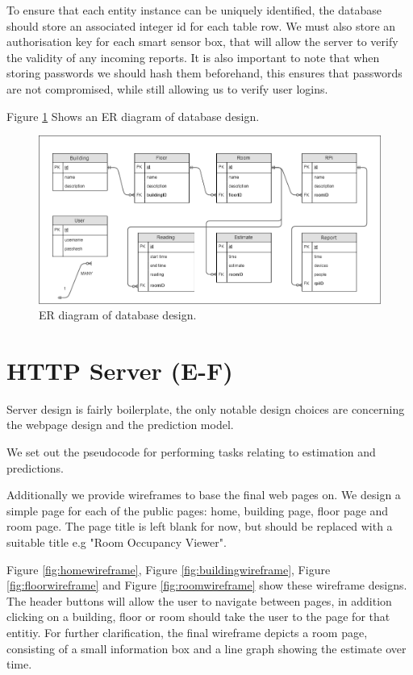 \documentclass{l4proj}
\begin{document}
To ensure that each entity instance can be uniquely identified, the database should store an associated integer id for each table row.
We must also store an authorisation key for each smart sensor box, that will allow the server to verify the validity of any incoming reports.
It is also important to note that when storing passwords we should hash them beforehand, this ensures that passwords are not compromised, while still allowing us to verify user logins.

Figure \ref{fig:ERdiagram} Shows an ER diagram of database design.
\begin{figure}
\centering
\includegraphics[width=\textwidth]{ERdiagram}
\caption{ER diagram of database design.}
\label{fig:ERdiagram}
\end{figure}



\section{HTTP Server (E-F)}

Server design is fairly boilerplate, the only notable design choices are concerning the webpage design and the prediction model.

We set out the pseudocode for performing tasks relating to estimation and predictions.

Additionally we provide wireframes to base the final web pages on. We design a simple page for each of the public pages: home, building page, floor page and room page. The page title is left blank for now, but should be replaced with a suitable title e.g "Room Occupancy Viewer".

Figure \ref{fig:homewireframe}, Figure \ref{fig:buildingwireframe}, Figure \ref{fig:floorwireframe} and Figure \ref{fig:roomwireframe} show these wireframe designs. The header buttons will allow the user to navigate between pages, in addition clicking on a building, floor or room should take the user to the page for that entitiy. For further clarification, the final wireframe depicts a room page, consisting of a small information box and a line graph showing the estimate over time.
\end{document}
